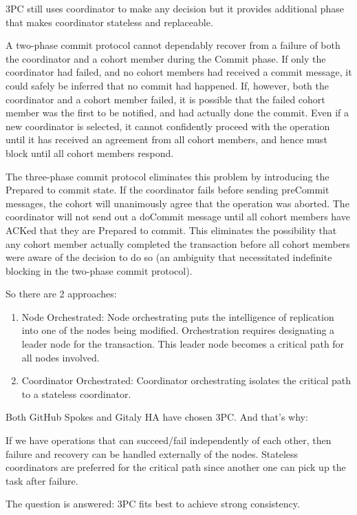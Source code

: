 \documentclass[acmlarge, screen, nonacm]{acmart}
\begin{document}
3PC still uses coordinator to make any decision but it provides additional phase that makes coordinator stateless and replaceable.

A two-phase commit protocol cannot dependably recover
from a failure of both the coordinator and a cohort member during the Commit phase.
If only the coordinator had failed, and no cohort members had received a commit message,
it could safely be inferred that no commit had happened.
If, however, both the coordinator and a cohort member failed,
it is possible that the failed cohort member was the first to be notified,
and had actually done the commit.
Even if a new coordinator is selected,
it cannot confidently proceed with the operation until it has received an agreement from all cohort members,
and hence must block until all cohort members respond.

The three-phase commit protocol eliminates this problem by introducing the Prepared to commit state.
If the coordinator fails before sending preCommit messages,
the cohort will unanimously agree that the operation was aborted.
The coordinator will not send out a doCommit message until all cohort members have ACKed that they are Prepared to commit.
This eliminates the possibility that any cohort member actually completed the transaction
before all cohort members were aware of the decision to do so (an ambiguity that necessitated indefinite blocking in the two-phase commit protocol).

So there are 2 approaches:
\begin{enumerate}
  \item Node Orchestrated: Node orchestrating puts the intelligence of replication into one of the nodes being modified.
Orchestration requires designating a leader node for the transaction.
This leader node becomes a critical path for all nodes involved.
  \item Coordinator Orchestrated: Coordinator orchestrating isolates the critical path to a stateless coordinator.
\end{enumerate}

Both GitHub Spokes and Gitaly HA have chosen 3PC. And that's why:

If we have operations that can succeed/fail independently of each other, then failure and recovery can be handled externally of the nodes.
Stateless coordinators are preferred for the critical path since another one can pick up the task after failure.

The question is answered: 3PC fits best to achieve strong consistency.
\end{document}
